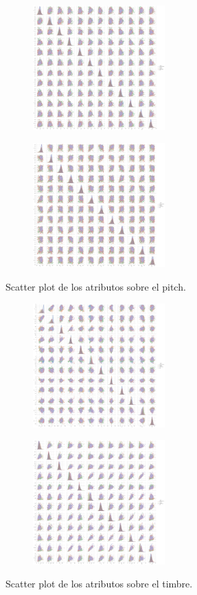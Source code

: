 \documentclass{icisfinal}
\begin{document}
\begin{figure}[H]
    \begin{subfigure}{.4\textwidth}
        \centering
        \includegraphics[width = 2in]{img/scatter-aa-pitches-avg.png}
    \end{subfigure}
    \begin{subfigure}{.4\textwidth}
        \centering
        \includegraphics[width = 2in]{img/scatter-aa-pitches-std.png}
    \end{subfigure}
    \caption{Scatter plot de los atributos sobre el pitch.}
    \label{fig:scatter-aa-pitches}
\end{figure}

\begin{figure}[h]
    \begin{subfigure}{.4\textwidth}
        \centering
        \includegraphics[width = 2in]{img/scatter-aa-timbres-avg.png}
    \end{subfigure}
    \begin{subfigure}{.4\textwidth}
        \centering
        \includegraphics[width = 2in]{img/scatter-aa-timbres-std.png}
    \end{subfigure}
    \caption{Scatter plot de los atributos sobre el timbre.}
    \label{fig:scatter-aa-timbres}
\end{figure}
\end{document}
